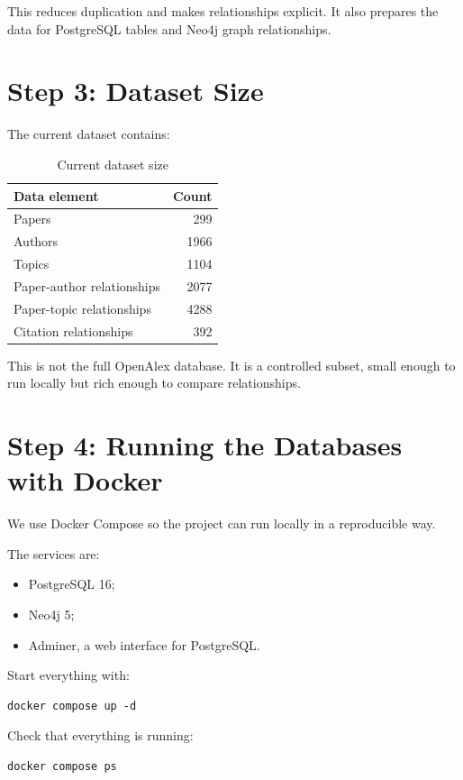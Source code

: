 \documentclass[11pt]{article}
\begin{document}
This reduces duplication and makes relationships explicit.
It also prepares the data for PostgreSQL tables and Neo4j graph relationships.

\section{Step 3: Dataset Size}

The current dataset contains:

\begin{table}[H]
\centering
\begin{tabular}{|l|r|}
\hline
\textbf{Data element} & \textbf{Count} \\
\hline
Papers & 299 \\
Authors & 1966 \\
Topics & 1104 \\
Paper-author relationships & 2077 \\
Paper-topic relationships & 4288 \\
Citation relationships & 392 \\
\hline
\end{tabular}
\caption{Current dataset size}
\end{table}

This is not the full OpenAlex database.
It is a controlled subset, small enough to run locally but rich enough to compare relationships.

\section{Step 4: Running the Databases with Docker}

We use Docker Compose so the project can run locally in a reproducible way.

The services are:

\begin{itemize}
    \item PostgreSQL 16;
    \item Neo4j 5;
    \item Adminer, a web interface for PostgreSQL.
\end{itemize}

Start everything with:

\begin{verbatim}
docker compose up -d
\end{verbatim}

Check that everything is running:

\begin{verbatim}
docker compose ps
\end{verbatim}
\end{document}
